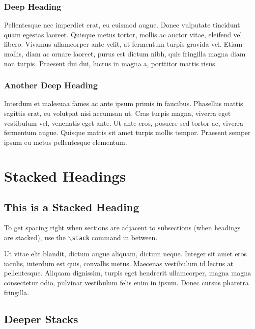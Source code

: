\subsubsection{Deep Heading}

Pellentesque nec imperdiet erat, eu euismod augue. Donec vulputate tincidunt
quam egestas laoreet. Quisque metus tortor, mollis ac auctor vitae, eleifend vel
libero. Vivamus ullamcorper ante velit, at fermentum turpis gravida vel. Etiam
mollis, diam ac ornare laoreet, purus est dictum nibh, quis fringilla magna diam
non turpis. Praesent dui dui, luctus in magna a, porttitor mattis risus.

\subsubsection{Another Deep Heading}

Interdum et malesuaa fames ac ante ipsum primis in faucibus. Phasellus mattis
sagittis erat, eu volutpat nisi accumsan ut. Cras turpis magna, viverra eget
vestibulum vel, venenatis eget ante. Ut ante eros, posuere sed tortor ac,
viverra fermentum augue. Quisque mattis sit amet turpis mollis tempor. Praesent
semper ipsum eu metus pellentesque elementum.

\section{Stacked Headings}

\stack

\subsection{This is a Stacked Heading}

To get spacing right when sections are adjacent to subsections (when headings
are stacked), use the \texttt{$\backslash$stack} command in between.

Ut vitae elit blandit, dictum augue aliquam, dictum neque. Integer sit amet eros
iaculis, interdum est quis, convallis metus. Maecenas vestibulum id lectus at
pellentesque. Aliquam dignissim, turpis eget hendrerit ullamcorper, magna magna
consectetur odio, pulvinar vestibulum felis enim in ipsum. Donec cursus pharetra
fringilla.

\subsection{Deeper Stacks}

